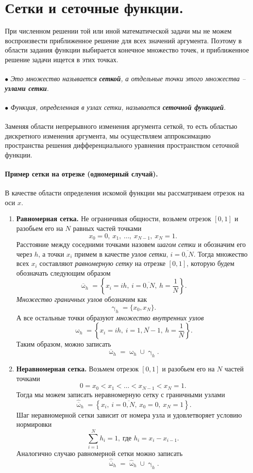 \documentclass[a4paper, 12pt]{report}
\numberwithin{equation}{section}
\renewcommand{\gamma}{\upgamma}
\renewcommand{\omega}{\upomega}
\begin{document}
	\section{Сетки и сеточные функции.}
	При численном решении той или иной математической задачи мы не можем воспроизвести приближенное решение для всех значений аргумента. Поэтому в области задания функции выбирается конечное множество точек, и приближенное решение задачи ищется в этих точках.
	\\\\
	$\bullet$ \textit{Это множество называется \textbf{сеткой}, а отдельные точки этого множества -- \textbf{узлами сетки}.}
	\\\\
	$\bullet$ \textit{Функция, определенная в узлах сетки, называется \textbf{сеточной функцией}.}
	\\\\
	Заменяя области непрерывного изменения аргумента сеткой, то есть областью дискретного изменения аргумента, мы осуществляем аппроксимацию пространства решения дифференциального уравнения пространством сеточной функции.
	\\\\
	\textbf{Пример сетки на отрезке (одномерный случай).}\\\\
	В качестве области определения искомой функции мы рассматриваем отрезок на оси $x$.
	\begin{enumerate}
		\item \textbf{Равномерная сетка.}
		Не ограничивая общности, возьмем отрезок $[0,1]$ и разобьем его на $N$ равных частей точками $$x_0=0,\ x_1,\ \ldots,\ x_{N-1},\ x_N=1.$$
		Расстояние между соседними точками назовем \textit{шагом сетки} и обозначим его через $h$, а точки $x_i$ примем в качестве \textit{узлов сетки}, $i=\overline{0,N}$. Тогда множество всех $x_i$ составляют \textit{равномерную сетку} на отрезке $[0,1]$, которую будем обозначать следующим образом
		$$\overline \omega _ h = \left\{x_i = ih,\ i=\overline{0, N},\ h = \dfrac1N\right\}.$$
		\textit{Множество граничных узлов} обозначим как $$\gamma_h = \{x_0, x_N\}.$$
		А все остальные точки образуют \textit{множество внутренних узлов}
		$$ \omega _ h = \left\{x_i = ih,\ i=\overline{1, N-1},\ h = \dfrac1N\right\}.$$
		Таким образом, можно записать 
		$$\overline \omega _h = \omega _h \cup \gamma _h.$$
		\item \textbf{Неравномерная сетка.}
		Возьмем отрезок $[0,1]$ и разобьем его на $N$ частей точками $$0=x_0 < x_1 <\ldots< x_{N-1} < x_N=1.$$
		Тогда мы можем записать неравномерную сетку с граничными узлами 
		$$\hat {\overline \omega} _ h = \left\{x_i,\ i=\overline{0, N},\ x_0 = 0, \ x_N=1\right\}.$$
		Шаг неравномерной сетки зависит от номера узла и удовлетворяет условию нормировки $$\sum_{i=1}^{N} h_i=1,\ \text{где } h_i=x_i - x_{i-1}.$$
		Аналогично случаю равномерной сетки можно записать $$\hat {\overline \omega} _ h = \hat \omega_h \cup \hat\gamma _h.$$
	\end{enumerate}
\end{document}
